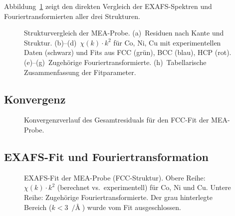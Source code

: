 
Abbildung~\ref{fig:struct-comparison} zeigt den direkten Vergleich der
EXAFS-Spektren und Fouriertransformierten aller drei Strukturen.

\begin{figure}[htbp]
  \centering
  \caption{Strukturvergleich der MEA-Probe.
    (a)~Residuen nach Kante und Struktur.
    (b)--(d)~$\chi(k)\cdot k^2$ für Co, Ni, Cu mit experimentellen
    Daten (schwarz) und Fits aus FCC (grün), BCC (blau), HCP (rot).
    (e)--(g)~Zugehörige Fouriertransformierte.
    (h)~Tabellarische Zusammenfassung der Fitparameter.}
  \label{fig:struct-comparison}
\end{figure}

\subsection{Konvergenz}

\begin{figure}[htbp]
  \centering
  \caption{Konvergenzverlauf des Gesamtresiduals für den FCC-Fit der
    MEA-Probe.}
  \label{fig:convergence-mea}
\end{figure}


\subsection{EXAFS-Fit und Fouriertransformation}

\begin{figure}[htbp]
  \centering
  \caption{EXAFS-Fit der MEA-Probe (FCC-Struktur).
    Obere Reihe: $\chi(k)\cdot k^2$ (berechnet vs.\ experimentell)
    für Co, Ni und Cu.
    Untere Reihe: Zugehörige Fouriertransformierte.
    Der grau hinterlegte Bereich ($k < \SI{3}{\per\Angstrom}$) wurde
    vom Fit ausgeschlossen.}
  \label{fig:exafs-ft-mea}
\end{figure}


